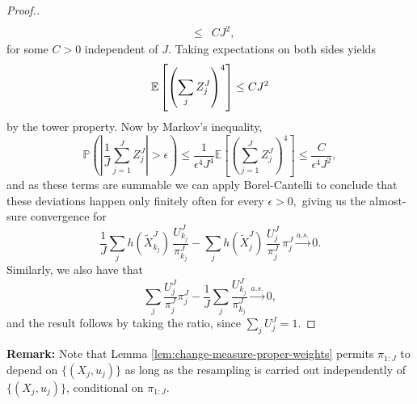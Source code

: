 \begin{proof}[Proof.]
\begin{eqnarray}
    \\ 
    &\leq& CJ^2,
    \end{eqnarray}
    for some $C>0$ independent of $J$.
    Taking expectations on both sides yields
    \begin{equation}\mathbb{E}\left[\left(\sum_j Z_j^J\right)^4 \right]  \leq CJ^2\end{equation}
    by the tower property. Now by Markov's inequality, 
    \begin{equation}\mathbb{P}\left(\left|\frac{1}{J} \sum_{j=1}^J Z_j^J\right|>\epsilon \right) 
    \leq \frac{1}{\epsilon^4J^4 } 
    \mathbb{E}\left[\left(\sum_{j=1}^J Z_j^J\right)^4\right] \leq \frac{C}{\epsilon^4J^2},\end{equation}
    and as these terms are summable we can apply Borel-Cantelli to conclude that these deviations happen only finitely often for every $\epsilon>0,$ giving us the almost-sure convergence for   
    \begin{equation} 
    \frac1J\sum_j h(\tilde X_{k_j}^J)\, \frac{U_{k_j}^J}{\pi_{k_j}^J}
    -  \sum_j h(\tilde X_j^J)\, \frac{U_j^J}{\pi_j^J}\, \pi_j^J \stackrel{a.s.}{\to} 0.
    \end{equation} 
    Similarly, we also have that
    \begin{equation} 
    \sum_j \frac{U_j^J}{\pi_j^J}\pi_j^J
    - \frac1J\sum_j \frac{U_{k_j}^J}{\pi_{k_j}^J} \stackrel{a.s.}{\to} 0,
    \end{equation}
    and the result follows by taking the ratio, since $\sum_j U_j^J=1$.

    
    
\end{proof}


\noindent \textbf{Remark:} Note that Lemma \ref{lem:change-measure-proper-weights} permits $\pi_{1:J}$ to depend on $\{(X_j,u_j)\}$ as long as the resampling is carried out independently of $\{(X_j,u_j)\}$, conditional on $\pi_{1:J}$.

